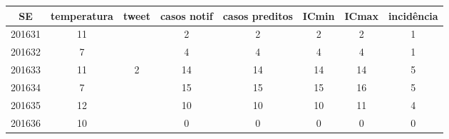 \begin{tabular}{c|ccccccc}
  \hline
SE & temperatura & tweet & casos notif & casos preditos & ICmin & ICmax & incidência \\ 
  \hline
201631 & 11 &  & 2 & 2 & 2 & 2 & 1 \\ 
  201632 & 7 &  & 4 & 4 & 4 & 4 & 1 \\ 
  201633 & 11 & 2 & 14 & 14 & 14 & 14 & 5 \\ 
  201634 & 7 &  & 15 & 15 & 15 & 16 & 5 \\ 
  201635 & 12 &  & 10 & 10 & 10 & 11 & 4 \\ 
  201636 & 10 &  & 0 & 0 & 0 & 0 & 0 \\ 
   \hline
\end{tabular}
